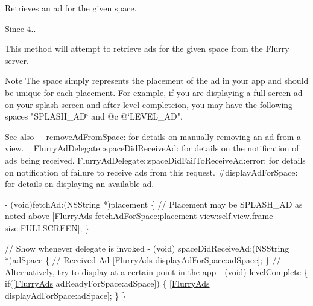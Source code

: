 Retrieves an ad for the given {\ttfamily space}. 

\begin{DoxySince}{Since}
4..
\end{DoxySince}
This method will attempt to retrieve ads for the given space from the \hyperlink{interfaceFlurry}{Flurry} server.

\begin{DoxyNote}{Note}
The {\ttfamily space} simply represents the placement of the ad in your app and should be unique for each placement. For example, if you are displaying a full screen ad on your splash screen and after level completeion, you may have the following spaces {\ttfamily "S\+P\+L\+A\+S\+H\+\_\+\+AD\char`\"{} and @c @\char`\"{}L\+E\+V\+E\+L\+\_\+\+AD"}.
\end{DoxyNote}
\begin{DoxySeeAlso}{See also}
\hyperlink{interfaceFlurryAds_aaf30e23048de55a1adb8a2c067428be6}{+ remove\+Ad\+From\+Space\+:} for details on manually removing an ad from a view. ~\newline
 Flurry\+Ad\+Delegate\+::space\+Did\+Receive\+Ad\+: for details on the notification of ads being received. Flurry\+Ad\+Delegate\+::space\+Did\+Fail\+To\+Receive\+Ad\+:error\+: for details on notification of failure to receive ads from this request. \#display\+Ad\+For\+Space\+: for details on displaying an available ad.
\end{DoxySeeAlso}

\begin{DoxyCode}
   - (void)fetchAd:(NSString *)placement 
\{
   \textcolor{comment}{// Placement may be SPLASH\_AD as noted above}
   [\hyperlink{interfaceFlurryAds}{FlurryAds} fetchAdForSpace:placement view:\textcolor{keyword}{self}.view.frame size:FULLSCREEN]; 
\}

   \textcolor{comment}{// Show whenever delegate is invoked}
- (void) spaceDidReceiveAd:(NSString *)adSpace \{
   \textcolor{comment}{// Received Ad}
   [\hyperlink{interfaceFlurryAds}{FlurryAds} displayAdForSpace:adSpace];
\}
   \textcolor{comment}{// Alternatively, try to display at a certain point in the app}
- (void) levelComplete \{
   \textcolor{keywordflow}{if}([\hyperlink{interfaceFlurryAds}{FlurryAds} adReadyForSpace:adSpace]) \{
       [\hyperlink{interfaceFlurryAds}{FlurryAds} displayAdForSpace:adSpace];
   \}
\}
\end{DoxyCode}



